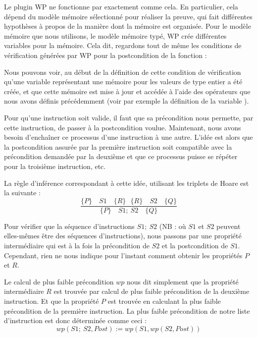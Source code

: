 Le plugin WP ne fonctionne par exactement comme cela. En particulier, cela dépend du
modèle mémoire sélectionné pour réaliser la preuve, qui fait différentes hypothèses à
propos de la manière dont la mémoire est organisée. Pour le modèle mémoire que nous
utilisons, le modèle mémoire typé, WP crée différentes variables pour la mémoire.
Cela dit, regardons tout de même les conditions de vérification générées par WP pour la
postcondition de la fonction  :



Nous pouvons voir, au début de la définition de cette condition de vérification qu'une
variable  représentant une mémoire pour les valeurs de type entier
a été créée, et que cette mémoire est mise à jour et accédée à l'aide des opérateurs que
nous avons définis précédemment (voir par exemple la définition de la variable
).




Pour qu'une instruction soit valide, il faut que sa précondition nous
permette, par cette instruction, de passer à la postcondition voulue.
Maintenant, nous avons besoin d'enchaîner ce processus d'une
instruction à une autre. L'idée est alors que la postcondition assurée par la
première instruction soit compatible avec la précondition demandée par la
deuxième et que ce processus puisse se répéter pour la troisième instruction,
etc.



La règle d'inférence correspondant à cette idée, utilisant les triplets de
Hoare est la suivante :
$$\dfrac{\{P\}\quad S1 \quad \{R\} \ \ \ \{R\}\quad S2 \quad \{Q\}}{\{P\}\quad S1 ;\ S2 \quad \{Q\}}$$



Pour vérifier que la séquence d'instructions $S1;\ S2$ (NB : où $S1$ et $S2$
peuvent elles-mêmes être des séquences d'instructions), nous passons par une
propriété intermédiaire qui est à la fois la précondition de $S2$ et la
postcondition de $S1$. Cependant, rien ne nous indique pour l'instant
comment obtenir les propriétés $P$ et $R$.



Le calcul de plus faible précondition $wp$ nous dit simplement que la
propriété intermédiaire $R$ est trouvée par calcul de plus faible précondition
de la deuxième instruction. Et que la propriété $P$ est trouvée en calculant la
plus faible précondition de la première instruction. La plus faible précondition
de notre liste d'instruction est donc déterminée comme ceci :
$$wp(S1;\ S2 , Post) := wp(S1, wp(S2, Post) )$$



